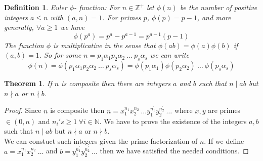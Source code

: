 \documentclass[12pt]{report}
\newtheorem{thm}{Theorem}
\newtheorem{defn}{Definition}
\begin{document}
\begin{defn}
    Euler $\phi$- function: For $n \in \mathbb{Z^+}$ let $\phi(n)$ be the number of positive integers $a \leq n$ with $(a,n) = 1$. For primes $p$, $\phi(p) = p-1$, and more generally, $\forall a \geq 1$ we have
    $$ \phi(p^a) = p^a - p^{a-1} = p^{a-1}(p-1)$$
    The function $\phi$ is {\em multiplicative} in the sense that $ \phi(ab) = \phi(a)\phi(b)$  if $(a,b) = 1$. So for some $n = p_1{\alpha_1}p_2{\alpha_2}~\dots ~p_s{\alpha_s}$ we can write
    $$ \phi(n) = \phi(p_1{\alpha_1}p_2{\alpha_2}~\dots ~p_s{\alpha_s}) = \phi(p_1{\alpha_1})\phi(p_2{\alpha_2}) ~\dots~ \phi(p_s{\alpha_s})$$
\end{defn}
\begin{thm}
    If $n$ is composite then there are integers $a$ and $b$ such that $n\mid ab$ but $n \nmid a$ or $n \nmid b$.
\end{thm}
\begin{proof}
    Since $n$ is composite then $n = x_1^{n_1} x_2^{n_2}~\dots y_1^{n_1^{'}}y_2^{n_2^{'}}~\dots $ where $ x,y$ are primes $\in (0,n)$ and $n_i's \geq 1~\forall i \in \mathbb{N}$. We have to prove the existence of the integers $a,b$ such that $n \mid ab$ but $n \nmid a$ or $n \nmid b$. \\
    We can constuct such integers given the prime factorization of $n$. If we define $a = x_1^{n_1} x_2^{n_2}~\dots $ and $ b = y_1^{n_1^{'}}y_2^{n_2^{'}}~\dots$ then we have satisfied the needed conditions.
\end{proof}
\end{document}
